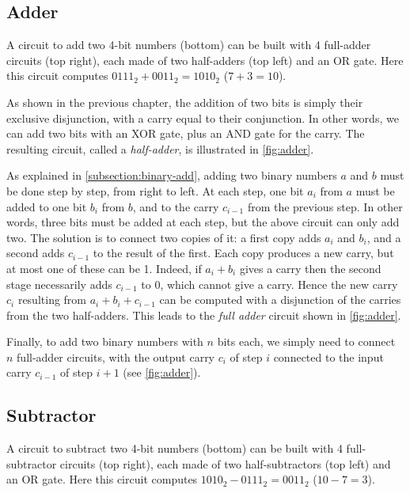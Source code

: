 \subsection{Adder}\label{subsection:adder-circuit}

\begin{Figure}
  

  \caption{A circuit to add two 4-bit numbers (bottom) can be built with 4
    full-adder circuits (top right), each made of two half-adders (top left) and
    an OR gate. Here this circuit computes $0111_2+0011_2=1010_2$
    ($7+3=10$).}\label{fig:adder}
\end{Figure}

As shown in the previous chapter, the addition of two bits is simply their
exclusive disjunction, with a carry equal to their conjunction. In other words,
we can add two bits with an XOR gate, plus an AND gate for the carry. The
resulting circuit, called a {\em half-adder}, is illustrated in
\cref{fig:adder}.

As explained in \cref{subsection:binary-add}, adding two binary numbers $a$ and
$b$ must be done step by step, from right to left. At each step, one bit $a_i$
from $a$ must be added to one bit $b_i$ from $b$, and to the carry $c_{i-1}$
from the previous step. In other words, three bits must be added at each step,
but the above circuit can only add two. The solution is to connect two copies
of it: a first copy adds $a_i$ and $b_i$, and a second adds $c_{i-1}$ to the
result of the first. Each copy produces a new carry, but at most one of these
can be 1. Indeed, if $a_i+b_i$ gives a carry then the second stage necessarily
adds $c_{i-1}$ to $0$, which cannot give a carry. Hence the new carry $c_i$
resulting from $a_i+b_i+c_{i-1}$ can be computed with a disjunction of the
carries from the two half-adders. This leads to the {\em full adder} circuit
shown in \cref{fig:adder}.

Finally, to add two binary numbers with $n$ bits each, we simply need to
connect $n$ full-adder circuits, with the output carry $c_i$ of step $i$
connected to the input carry $c_{i-1}$ of step $i+1$ (see \cref{fig:adder}).

\subsection{Subtractor}

\begin{Figure}
  

  \caption{A circuit to subtract two 4-bit numbers (bottom) can be built with 4
    full-subtractor circuits (top right), each made of two half-subtractors (top
    left) and an OR gate. Here this circuit computes $1010_2-0111_2=0011_2$
    ($10-7=3$).}\label{fig:subtractor}
\end{Figure}

